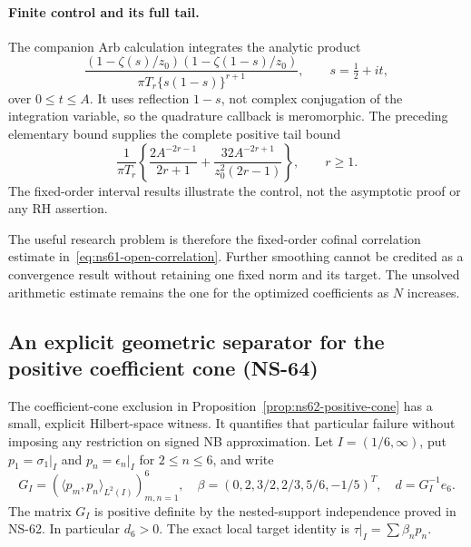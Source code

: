 \documentclass[11pt]{article}
\theoremstyle{remark}
\begin{document}
\paragraph{Finite control and its full tail.}
The companion Arb calculation integrates the analytic product
\[
 \frac{(1-\zeta(s)/z_0)(1-\zeta(1-s)/z_0)}
             {\pi T_r\{s(1-s)\}^{r+1}},\qquad s=\tfrac12+it,
\]
over $0\leq t\leq A$. It uses reflection $1-s$, not complex
conjugation of the integration variable, so the quadrature callback
is meromorphic. The preceding elementary bound supplies the complete
positive tail bound
\begin{equation}
 \frac1{\pi T_r}\left\{
       \frac{2A^{-2r-1}}{2r+1}
       +\frac{32A^{-2r+1}}{z_0^2(2r-1)}\right\},\qquad r\geq1.
 \label{eq:ns63-quadrature-tail}
\end{equation}
The fixed-order interval results illustrate the control, not the
asymptotic proof or any RH assertion.

The useful research problem is therefore the fixed-order cofinal
correlation estimate in~\eqref{eq:ns61-open-correlation}. Further
smoothing cannot be credited as a convergence result without retaining
one fixed norm and its target. The unsolved arithmetic estimate remains
the one for the optimized coefficients as $N$ increases.

\subsection{An explicit geometric separator for the positive coefficient cone (NS-64)}
\label{sec:ns64-cone-separator}

The coefficient-cone exclusion in Proposition~\ref{prop:ns62-positive-cone}
has a small, explicit Hilbert-space witness. It quantifies that particular
failure without imposing any restriction on signed NB approximation.
Let $I=(1/6,\infty)$, put $p_1=\sigma_1|_I$ and
$p_n=\epsilon_n|_I$ for $2\leq n\leq6$, and write
\[
 G_I=(\langle p_m,p_n\rangle_{L^2(I)})_{m,n=1}^6,\quad
 \beta=(0,2,3/2,2/3,5/6,-1/5)^T,\quad
 d=G_I^{-1}e_6.
\]
The matrix $G_I$ is positive definite by the nested-support independence
proved in NS-62. In particular $d_6>0$.
The exact local target identity is $\tau|_I=\sum\beta_np_n$.
\end{document}
